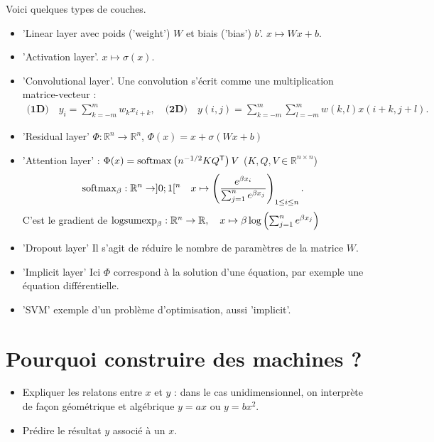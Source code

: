 \documentclass[11pt,a4paper]{article}
\newcommand{\R}{\mathbb R}
\newcommand{\transpose}[1]{{#1}^{\mathsf{T}}}
\begin{document}
%
Voici quelques types de couches.
%
\begin{itemize}
\item 'Linear layer avec poids ('weight') $W$ et biais ('bias') $b$'. $x \mapsto W x + b$.
\item 'Activation layer'. $x \mapsto \sigma(x)$.
\item 'Convolutional layer'. Une convolution s'écrit comme une multiplication matrice-vecteur :
\begin{align*}
\textbf{(1D)}\quad y_i = \sum_{k=-m}^m w_k x_{i+k},\quad \textbf{(2D)}\quad y(i,j) = \sum_{k=-m}^m\sum_{l=-m}^m w(k,l) x(i+k, j+l).
\end{align*}

\item 'Residual layer' $\Phi:\R^n\to\R^n$, $\Phi(x) = x +\sigma(W x + b)$
\item 'Attention layer' : $\Phi(x) = {\rm softmax}\left(n^{-1/2} K \transpose{Q}\right)V$ ($K,Q,V\in\R^{n\times n}$)
\begin{align*}
{\rm softmax}_{\beta}: \R^n\to]0;1[^n\quad x\mapsto \left(\frac{e^{\beta x_i}}{\sum_{j=1}^n e^{\beta x_j}}\right)_{1\le i\le n}.
\end{align*}
C'est le gradient de  ${\rm logsumexp}_{\beta}: \R^n\to\R,\quad x\mapsto \beta\log\left(\sum_{j=1}^n e^{\beta x_j}\right)$
\item 'Dropout layer' Il s'agit de réduire le nombre de paramètres de la matrice $W$.
\item 'Implicit layer' Ici $\Phi$ correspond à la solution d'une équation, par exemple une équation différentielle.
\item 'SVM' exemple d'un problème d'optimisation, aussi 'implicit'.
\end{itemize}
%
\section{Pourquoi construire des machines ?}\label{sec:}
%
\begin{itemize}
\item Expliquer les relatons entre $x$ et $y$ : dans le cas unidimensionnel, on interprète de façon géométrique et algébrique $y=a x$ ou $y=bx^2$.
\item Prédire le résultat $y$ associé à un $x$.
\end{itemize}
%
\end{document}
